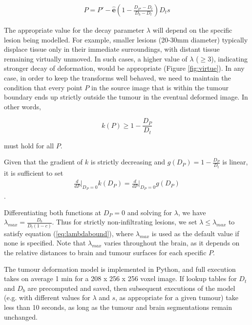 \begin{align}
  P = P' - \mathbf{\hat{e}}(1-\frac{D_{P'}-D_t}{D_b-D_t})D_ts
\end{align}

The appropriate value for the decay parameter $\lambda$ will depend on the specific lesion being modelled. For example, smaller lesions (20-30mm diameter) typically displace tissue only in their immediate surroundings, with distant tissue remaining virtually unmoved. In such cases, a higher value of $\lambda$ ($\geq 3$), indicating stronger decay of deformation, would be appropriate (Figure \ref{fig:virtue}).
In any case, in order to keep the transforms well behaved, we need to maintain the condition that every point $P$ in the source image that is within the tumour boundary ends up strictly outside the tumour in the eventual deformed image.
In other words,

\begin{equation}\label{eq:lambdabound}
  k(P) \geq 1 - \frac{D_P}{D_t}
\end{equation}

must hold for all $P$.

Given that the gradient of $k$ is strictly decreasing and $g(D_P) = 1 - \frac{D_P}{D_t}$ is linear, it is sufficient to set
\begin{align}
  \frac{d}{dP}\bigg\rvert_{D_P=0}k(D_P) = \frac{d}{dP}\bigg\rvert_{D_P=0}g(D_P)
\end{align}.

Differentiating both functions at $D_P=0$ and solving for $\lambda$, we have $\lambda_{max} = \frac{D_b}{D_t (1-c)}$.
Thus for strictly non-infiltrating lesions, we set $\lambda \leq \lambda_{max}$ to satisfy equation (\ref{eq:lambdabound}), where $\lambda_{max}$ is used as the default value if none is specified. Note that $\lambda_{max}$ varies throughout the brain, as it depends on the relative distances to brain and tumour surfaces for each specific $P$.

The tumour deformation model is implemented in Python, and full execution takes on average 1 min for a 208 x 256 x 256 voxel image.
If lookup tables for $ D_t$ and $D_b$ are precomputed and saved, then subsequent executions of the model (e.g. with different values for $\lambda$ and $s$, as appropriate for a given tumour) take less than 10 seconds, as long as the tumour and brain segmentations remain unchanged.

